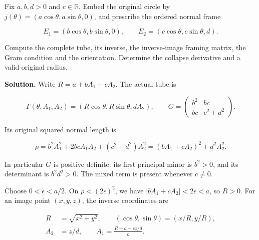 \label{courseIII:pontryagin-thom:9.1}

Fix \(a,b,d>0\) and \(c\in\mathbb R\). Embed the original circle by \(j(\theta)=(a\cos\theta,a\sin\theta,0)\), and prescribe the ordered normal frame

\begin{equation}
E_1=(b\cos\theta,b\sin\theta,0),\qquad
 E_2=(c\cos\theta,c\sin\theta,d).
 \label{courseIII:framed-manifolds-and-the-pontryagin-thom-map:eq:9.1}
\end{equation}

Compute the complete tube, its inverse, the inverse-image framing matrix, the Gram condition and the orientation. Determine the collapse derivative and a valid original radius.

\textbf{Solution.} Write \(R=a+bA_1+cA_2\). The actual tube is

\begin{equation}
\Gamma(\theta,A_1,A_2)
       =(R\cos\theta,R\sin\theta,dA_2),\qquad
 G=\begin{pmatrix}b^2&bc\\bc&c^2+d^2\end{pmatrix}.
 \label{courseIII:framed-manifolds-and-the-pontryagin-thom-map:eq:9.2}
\end{equation}

Its original squared normal length is

\begin{equation}
\rho=b^2A_1^2+2bcA_1A_2+(c^2+d^2)A_2^2
                   =(bA_1+cA_2)^2+d^2A_2^2.
 \label{courseIII:framed-manifolds-and-the-pontryagin-thom-map:eq:9.3}
\end{equation}

In particular \(G\) is positive definite: its first principal minor is \(b^2>0\), and its determinant is \(b^2d^2>0\). The mixed term is present whenever \(c\ne0\).

Choose \(0<\epsilon<a/2\). On \(\rho<(2\epsilon)^2\), we have \(|bA_1+cA_2|<2\epsilon<a\), so \(R>0\). For an image point \((x,y,z)\), the inverse coordinates are

\begin{equation}
\begin{aligned}
 R&=\sqrt{x^2+y^2},\qquad
 (\cos\theta,\sin\theta)=(x/R,y/R),\\
 A_2&=z/d,\qquad
 A_1=\frac{R-a-cz/d}{b}.
 \end{aligned}
 \label{courseIII:framed-manifolds-and-the-pontryagin-thom-map:eq:9.4}
\end{equation}


